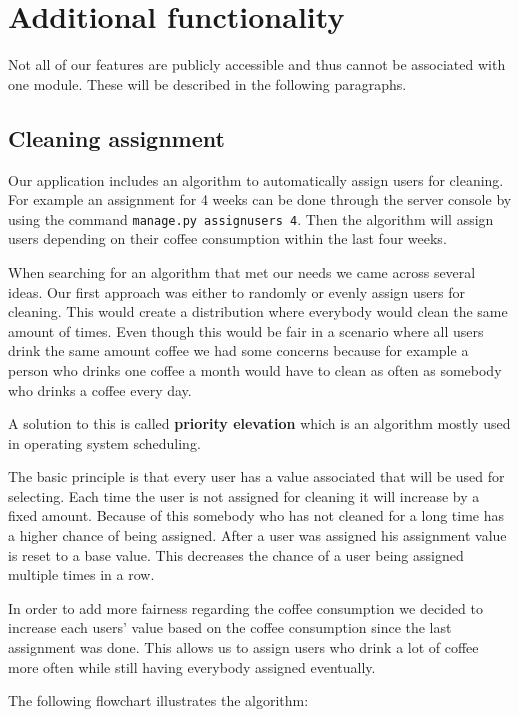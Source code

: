 \newpage
\section{Additional functionality}\label{additional-functionality}

Not all of our features are publicly accessible and thus cannot be
associated with one module. These will be described in the following
paragraphs.

\subsection{Cleaning assignment}\label{cleaning-assignment}

Our application includes an algorithm to automatically assign users for
cleaning. For example an assignment for 4 weeks can be done through the
server console by using the command \texttt{manage.py\ assignusers\ 4}.
Then the algorithm will assign users depending on their coffee
consumption within the last four weeks.

When searching for an algorithm that met our needs we came across
several ideas. Our first approach was either to randomly or evenly
assign users for cleaning. This would create a distribution where
everybody would clean the same amount of times. Even though this would
be fair in a scenario where all users drink the same amount coffee we
had some concerns because for example a person who drinks one coffee a
month would have to clean as often as somebody who drinks a coffee every
day.

A solution to this is called \textbf{priority elevation} which is an
algorithm mostly used in operating system scheduling.

The basic principle is that every user has a value associated that will
be used for selecting. Each time the user is not assigned for cleaning
it will increase by a fixed amount. Because of this somebody who has not
cleaned for a long time has a higher chance of being assigned. After a
user was assigned his assignment value is reset to a base value. This
decreases the chance of a user being assigned multiple times in a row.

In order to add more fairness regarding the coffee consumption we
decided to increase each users' value based on the coffee consumption
since the last assignment was done. This allows us to assign users who
drink a lot of coffee more often while still having everybody assigned
eventually.

The following flowchart illustrates the algorithm:

